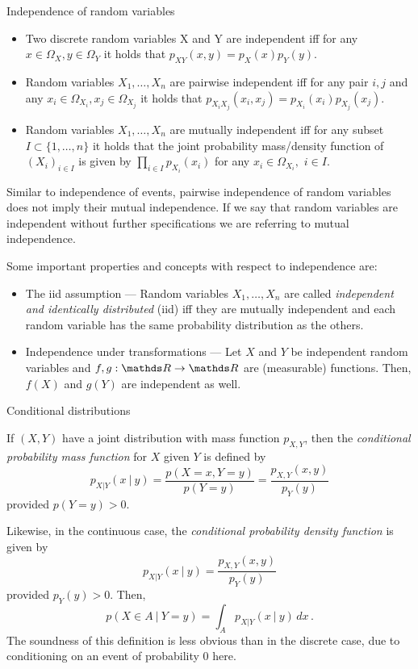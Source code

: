 \begin{vbframe}{Independence of random variables}  
 
\begin{itemize}
	\item 	Two discrete random variables X and Y are independent iff for any $x\in \Omega_X,y\in \Omega_Y$ it holds that $	p_{XY}(x,y) =	p_X(x) p_Y(y).$
	\item Random variables $X_1, \ldots, X_n$ are pairwise independent iff for any pair $i,j$ and any $x_i\in \Omega_{X_i},x_j\in \Omega_{X_j}$ it holds that $	p_{X_iX_j}(x_i,x_j) =	p_{X_i}(x_i) p_{X_j}(x_j).$
	\item Random variables  $X_1, \ldots, X_n$ are mutually independent iff for any subset $I \subset \{1,\ldots,n\}$ it holds that the joint probability mass/density function of $(X_i)_{i\in I}$ is given by
	$  \prod_{i \in I}	p_{X_i}(x_i)$  for any $x_i \in \Omega_{X_i},$ $i\in I.$
\end{itemize}
%
Similar to independence of events, pairwise independence of random variables does not imply their
mutual independence. If we say that random variables are independent without further specifications we
are referring to mutual independence.
%
\framebreak

%
 Some important properties and concepts with respect to independence are:
%	
\begin{itemize}
	\item The iid assumption --- Random variables  $X_1, \ldots, X_n$ are called  \emph{independent and identically distributed} (iid) iff they are mutually independent and each random variable has the same probability distribution as the others.
	\item Independence under transformations --- Let $X$ and $Y$ be independent random variables and $f,g:\R \to \R$ are (measurable) functions. Then, $f(X)$ and $g(Y)$ are independent as well. 
\end{itemize}
%
\end{vbframe}



\begin{frame}[t]{Conditional distributions}
	 
		 If $(X,Y)$ have a joint distribution with mass function $p_{X,Y}$, then the \emph{conditional probability mass function} for $X$ given $Y$ is defined by
		$$
		p_{X|Y}(x ~|~ y) = \frac{p(X=x, Y=y)}{p(Y = y)}  = \frac{p_{X,Y}(x,y)}{p_Y(y)} 
		$$
		provided $p(Y = y) > 0$.
		\lz
		
		Likewise, in the continuous case, the \emph{conditional probability density function} is given by
		$$
		p_{X|Y}(x ~|~ y) = \frac{p_{X,Y}(x,y)}{p_Y(y)} 
		$$
		provided $p_Y(y) > 0$. Then,
		$$
		p(X \in A ~|~ Y= y) = \int_A  p_{X|Y}(x ~|~ y) \, dx \, .
		$$
		The soundness of this definition is less obvious than in the discrete case, due to conditioning on an event of probability 0 here. 
		
\end{frame}


